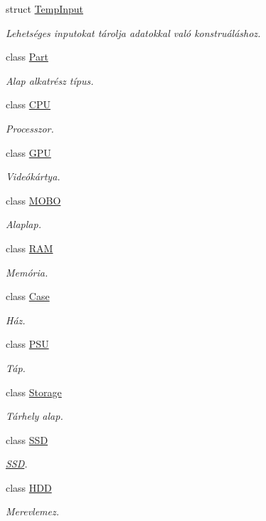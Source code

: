\begin{DoxyCompactItemize}
\item 
struct \mbox{\hyperlink{struct_temp_input}{Temp\+Input}}
\begin{DoxyCompactList}\small\item\em Lehetséges inputokat tárolja adatokkal való konstruáláshoz. \end{DoxyCompactList}\item 
class \mbox{\hyperlink{class_part}{Part}}
\begin{DoxyCompactList}\small\item\em Alap alkatrész típus. \end{DoxyCompactList}\item 
class \mbox{\hyperlink{class_c_p_u}{C\+PU}}
\begin{DoxyCompactList}\small\item\em Processzor. \end{DoxyCompactList}\item 
class \mbox{\hyperlink{class_g_p_u}{G\+PU}}
\begin{DoxyCompactList}\small\item\em Videókártya. \end{DoxyCompactList}\item 
class \mbox{\hyperlink{class_m_o_b_o}{M\+O\+BO}}
\begin{DoxyCompactList}\small\item\em Alaplap. \end{DoxyCompactList}\item 
class \mbox{\hyperlink{class_r_a_m}{R\+AM}}
\begin{DoxyCompactList}\small\item\em Memória. \end{DoxyCompactList}\item 
class \mbox{\hyperlink{class_case}{Case}}
\begin{DoxyCompactList}\small\item\em Ház. \end{DoxyCompactList}\item 
class \mbox{\hyperlink{class_p_s_u}{P\+SU}}
\begin{DoxyCompactList}\small\item\em Táp. \end{DoxyCompactList}\item 
class \mbox{\hyperlink{class_storage}{Storage}}
\begin{DoxyCompactList}\small\item\em Tárhely alap. \end{DoxyCompactList}\item 
class \mbox{\hyperlink{class_s_s_d}{S\+SD}}
\begin{DoxyCompactList}\small\item\em \mbox{\hyperlink{class_s_s_d}{S\+SD}}. \end{DoxyCompactList}\item 
class \mbox{\hyperlink{class_h_d_d}{H\+DD}}
\begin{DoxyCompactList}\small\item\em Merevlemez. \end{DoxyCompactList}\end{DoxyCompactItemize}
